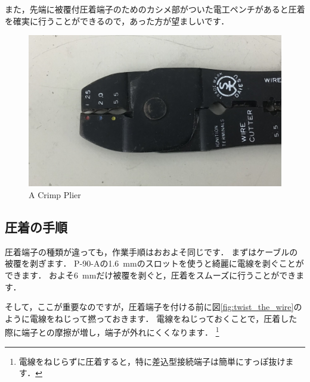 \documentclass[{../../master}]{subfiles}
\begin{document}
また，先端に被覆付圧着端子のためのカシメ部がついた電工ペンチがあると圧着を確実に行うことができるので，あった方が望ましいです．

\begin{figure}[ht]
  \centering
  \includegraphics[height=50truemm]{images/crimp_plier.jpg}
  \caption{A Crimp Plier}
\end{figure}


\subsection{圧着の手順}

圧着端子の種類が違っても，作業手順はおおよそ同じです．
まずはケーブルの被覆を剥ぎます．
P-90-Aの\SI{1.6}{mm}のスロットを使うと綺麗に電線を剥ぐことができます．
およそ\SI{6}{mm}だけ被覆を剥ぐと，圧着をスムーズに行うことができます．

そして，ここが重要なのですが，圧着端子を付ける前に図\ref{fig:twist_the_wire}のように電線をねじって撚っておきます．
電線をねじっておくことで，圧着した際に端子との摩擦が増し，端子が外れにくくなります．
\footnote{電線をねじらずに圧着すると，特に差込型接続端子は簡単にすっぽ抜けます．}
\end{document}

